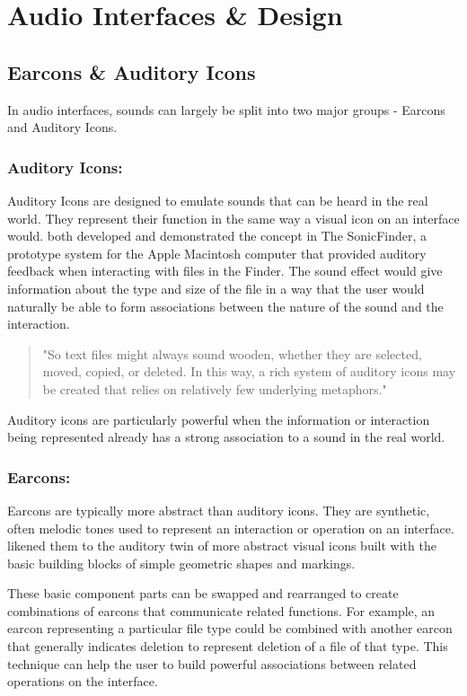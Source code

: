 \documentclass{l4proj}
\begin{document}
\section{Audio Interfaces \& Design}

\subsection{Earcons \& Auditory Icons}
In audio interfaces, sounds can largely be split into two major groups - Earcons and Auditory Icons.

\subsubsection{Auditory Icons:} \label{subsec:auditory_icons}
Auditory Icons are designed to emulate sounds that can be heard in the real world. They represent their function in the same way a visual icon on an interface would. \cite{gaver_sonicfinder_1989} both developed and demonstrated the concept in The SonicFinder, a prototype system for the Apple Macintosh computer that provided auditory feedback when interacting with files in the Finder. The sound effect would give information about the type and size of the file in a way that the user would naturally be able to form associations between the nature of the sound and the interaction.
\begin{quote}
    "So text files might always sound wooden, whether they are selected, moved, copied, or deleted. In this way, a rich system of auditory icons may be created that relies on relatively few underlying metaphors."
\end{quote} \citep{gaver_sonicfinder_1989}

Auditory icons are particularly powerful when the information or interaction being represented already has a strong association to a sound in the real world. 

\subsubsection{Earcons:} \label{subsec:earcons}
Earcons are typically more abstract than auditory icons. They are synthetic, often melodic tones used to represent an interaction or operation on an interface. \cite{blattner_earcons_1989} likened them to the auditory twin of more abstract visual icons built with the basic building blocks of simple geometric shapes and markings. 

These basic component parts can be swapped and rearranged to create combinations of earcons that communicate related functions. For example, an earcon representing a particular file type could be combined with another earcon that generally indicates deletion to represent deletion of a file of that type. This technique can help the user to build powerful associations between related operations on the interface.
\end{document}
